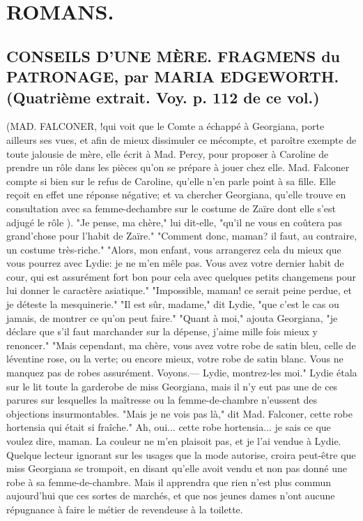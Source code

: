 \setcounter{page}{265}
\chapter{ROMANS.}
\section{CONSEILS D'UNE MÈRE. FRAGMENS du PATRONAGE, par MARIA EDGEWORTH. \large{(Quatrième extrait. Voy. p. 112 de ce vol.)}}
(MAD. FALCONER, !qui voit que le Comte a échappé à Georgiana, porte ailleurs ses vues, et afin de mieux dissimuler ce mécompte, et paroître exempte de toute jalousie de mère, elle écrit à Mad. Percy, pour proposer à Caroline de prendre un rôle dans les pièces qu'on se prépare à jouer chez elle. Mad. Falconer compte si bien sur le refus de Caroline, qu'elle n'en parle point à sa fille. Elle reçoit en effet une réponse négative; et va chercher Georgiana, qu'elle trouve en consultation avec sa femme-dechambre sur le costume de Zaïre dont elle s'est adjugé le rôle ).
"Je pense, ma chère," lui dit-elle, "qu'il ne vous en coûtera pas grand'chose pour l'habit de Zaïre."
"Comment donc, maman? il faut, au contraire, un costume très-riche."\setcounter{page}{266} "Alors, mon enfant, vous arrangerez cela du mieux que vous pourrez avec Lydie: je ne m'en mêle pas. Vous avez votre dernier habit de cour, qui est assurément fort bon pour cela avec quelques petits changemens pour lui donner le caractère asiatique."
"Impossible, maman! ce serait peine perdue, et je déteste la mesquinerie."
"Il est sûr, madame," dit Lydie, "que c'est le cas ou jamais, de montrer ce qu'on peut faire."
"Quant à moi," ajouta Georgiana, "je déclare que s'il faut marchander sur la dépense, j'aime mille fois mieux y renoncer."
"Mais cependant, ma chère, vous avez votre robe de satin bleu, celle de léventine rose, ou la verte; ou encore mieux, votre robe de satin blanc. Vous ne manquez pas de robes assurément. Voyons.— Lydie, montrez-les moi."
Lydie étala sur le lit toute la garderobe de miss Georgiana, mais il n'y eut pas une de ces parures sur lesquelles la maîtresse ou la femme-de-chambre n'eussent des objections insurmontables.
"Mais je ne vois pas là," dit Mad. Falconer, cette robe hortensia qui était si fraîche."\setcounter{page}{267} Ah, oui... cette robe hortensia... je sais ce que voulez dire, maman. La couleur ne m'en plaisoit pas, et je l'ai vendue à Lydie.
Quelque lecteur ignorant sur les usages que la mode autorise, croira peut-être que miss Georgiana se trompoit, en disant qu'elle avoit vendu et non pas donné une robe à sa femme-de-chambre. Mais il apprendra que rien n'est plus commun aujourd'hui que ces sortes de marchés, et que nos jeunes dames n'ont aucune répugnance à faire le métier de revendeuse à la toilette.
